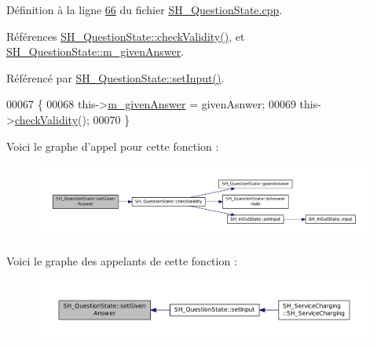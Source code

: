 Définition à la ligne \hyperlink{SH__QuestionState_8cpp_source_l00066}{66} du fichier \hyperlink{SH__QuestionState_8cpp_source}{S\-H\-\_\-\-Question\-State.\-cpp}.



Références \hyperlink{classSH__QuestionState_a3ca5459c20ef591023c0572d8224146c}{S\-H\-\_\-\-Question\-State\-::check\-Validity()}, et \hyperlink{classSH__QuestionState_a309bb96a6aed67d190f9ab995fdc7c61}{S\-H\-\_\-\-Question\-State\-::m\-\_\-given\-Answer}.



Référencé par \hyperlink{classSH__QuestionState_a331222d371d9c97392f35c84a5ef43e1}{S\-H\-\_\-\-Question\-State\-::set\-Input()}.


\begin{DoxyCode}
00067 \{
00068     this->\hyperlink{classSH__QuestionState_a309bb96a6aed67d190f9ab995fdc7c61}{m\_givenAnswer} = givenAsnwer;
00069     this->\hyperlink{classSH__QuestionState_a3ca5459c20ef591023c0572d8224146c}{checkValidity}();
00070 \}
\end{DoxyCode}


Voici le graphe d'appel pour cette fonction \-:
\nopagebreak
\begin{figure}[H]
\begin{center}
\leavevmode
\includegraphics[width=350pt]{classSH__QuestionState_a9d285a34a7002fd05a7fa8ff9139c264_cgraph}
\end{center}
\end{figure}




Voici le graphe des appelants de cette fonction \-:
\nopagebreak
\begin{figure}[H]
\begin{center}
\leavevmode
\includegraphics[width=350pt]{classSH__QuestionState_a9d285a34a7002fd05a7fa8ff9139c264_icgraph}
\end{center}
\end{figure}


